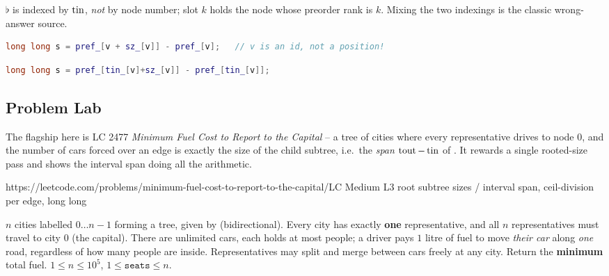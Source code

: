 \begin{warningbox}
$\flat$ is indexed by $\operatorname{tin}$, \emph{not} by node number; slot $k$ holds the node whose
preorder rank is $k$. Mixing the two indexings is the classic wrong-answer source.
\end{warningbox}
\begin{lstlisting}[caption={\textcolor{warningred}{WRONG}: indexing the flat array by node id}, language=C++, basicstyle=\ttfamily\small]
long long s = pref_[v + sz_[v]] - pref_[v];   // v is an id, not a position!
\end{lstlisting}
\begin{lstlisting}[caption={\textcolor{successgreen}{RIGHT}: positions come from $\tin$}, language=C++, basicstyle=\ttfamily\small]
long long s = pref_[tin_[v]+sz_[v]] - pref_[tin_[v]];
\end{lstlisting}

\subsection{Problem Lab}

The flagship here is LC 2477 \emph{Minimum Fuel Cost to Report to the Capital} -- a tree of
cities where every representative drives to node $0$, and the number of cars forced over an
edge is exactly the size of the child subtree, i.e.\ the \emph{span} $\operatorname{tout}-\operatorname{tin}$ of
. It rewards a single rooted-size pass and shows the interval span doing
all the arithmetic.

  {https://leetcode.com/problems/minimum-fuel-cost-to-report-to-the-capital/}{LC Medium L3}
  {root subtree sizes / interval span, ceil-division per edge, long long}

\begin{problemstatement}
$n$ cities labelled $0 \dots n{-}1$ forming a tree, given by 
(bidirectional). Every city has exactly \textbf{one} representative, and all $n$
representatives must travel to city $0$ (the capital). There are unlimited cars, each holds
at most  people; a driver pays $1$ litre of fuel to move \emph{their car} along
\emph{one} road, regardless of how many people are inside. Representatives may split and
merge between cars freely at any city. Return the \textbf{minimum} total fuel.
$1 \le n \le 10^5$, $1 \le \texttt{seats} \le n$.
\end{problemstatement}

